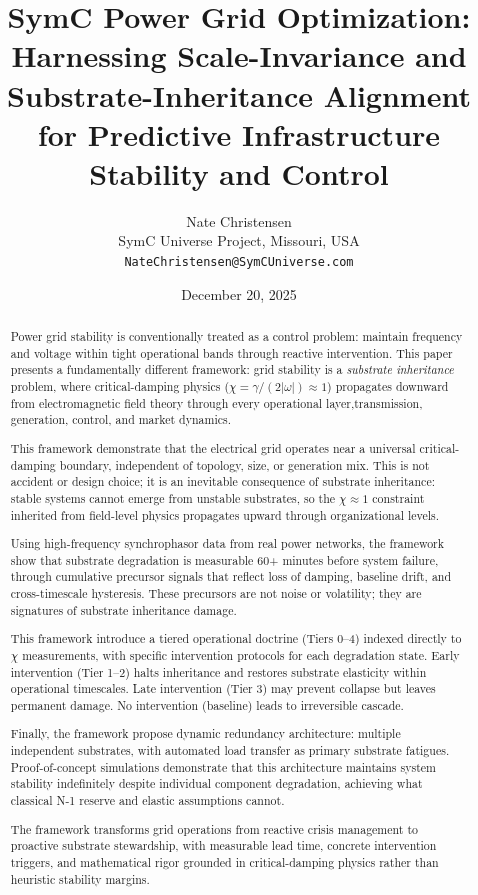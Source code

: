 \documentclass[11pt,letterpaper]{article}
\title{\textbf{SymC Power Grid Optimization: Harnessing Scale-Invariance and Substrate-Inheritance Alignment for Predictive Infrastructure Stability and Control}}
\author{Nate Christensen\\
SymC Universe Project, Missouri, USA\\
\texttt{NateChristensen@SymCUniverse.com}}
\date{December 20, 2025}
\begin{document}
\maketitle

\begin{abstract}

Power grid stability is conventionally treated as a control problem: maintain frequency and voltage within tight operational bands through reactive intervention. This paper presents a fundamentally different framework: grid stability is a \textit{substrate inheritance} problem, where critical-damping physics ($\chi = \gamma/(2|\omega|) \approx 1$) propagates downward from electromagnetic field theory through every operational layer,transmission, generation, control, and market dynamics.

This framework demonstrate that the electrical grid operates near a universal critical-damping boundary, independent of topology, size, or generation mix. This is not accident or design choice; it is an inevitable consequence of substrate inheritance: stable systems cannot emerge from unstable substrates, so the $\chi \approx 1$ constraint inherited from field-level physics propagates upward through organizational levels.

Using high-frequency synchrophasor data from real power networks, the framework show that substrate degradation is measurable 60+ minutes before system failure, through cumulative precursor signals that reflect loss of damping, baseline drift, and cross-timescale hysteresis. These precursors are not noise or volatility; they are signatures of substrate inheritance damage.

This framework introduce a tiered operational doctrine (Tiers 0--4) indexed directly to $\chi$ measurements, with specific intervention protocols for each degradation state. Early intervention (Tier 1--2) halts inheritance and restores substrate elasticity within operational timescales. Late intervention (Tier 3) may prevent collapse but leaves permanent damage. No intervention (baseline) leads to irreversible cascade.

Finally, the framework propose dynamic redundancy architecture: multiple independent substrates, with automated load transfer as primary substrate fatigues. Proof-of-concept simulations demonstrate that this architecture maintains system stability indefinitely despite individual component degradation, achieving what classical N-1 reserve and elastic assumptions cannot.

The framework transforms grid operations from reactive crisis management to proactive substrate stewardship, with measurable lead time, concrete intervention triggers, and mathematical rigor grounded in critical-damping physics rather than heuristic stability margins.

\end{abstract}
\end{document}
